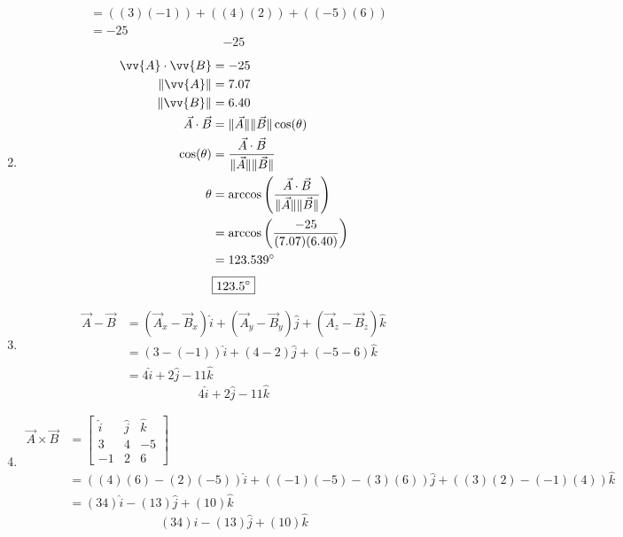 \documentclass{article}
\begin{document}
\begin{enumerate}[label=\alph*)]
\begin{align*}
                                & = ((3)(-1)) + ((4)(2)) + ((-5)(6)) \\
                                & = -25
        \end{align*}
        \begin{equation*}
            \boxed{-25}
        \end{equation*}
    \item
        \begin{align*}
            \vv{A} \cdot \vv{B} & = -25 \\
            \|\vv{A}\| & = 7.07 \\
            \|\vv{B}\| & = 6.40 \\
            \vec{A} \cdot \vec{B} & = \|\vec{A}\|\|\vec{B}\|\cos(\theta) \\
            \cos(\theta) & = \frac{\vec{A} \cdot \vec{B}}{\|\vec{A}\|\|\vec{B}\|} \\
            \theta & = \arccos\left(\frac{\vec{A} \cdot \vec{B}}{\|\vec{A}\|\|\vec{B}\|}\right) \\
                   & = \arccos\left(\frac{-25}{(7.07)(6.40)}\right) \\
                   & = 123.539\degree
        \end{align*}
        \begin{equation*}
            \boxed{123.5\degree}
        \end{equation*}
    \item
        \begin{align*}
            \vec{A} - \vec{B} & = (\vec{A}_x - \vec{B}_x)\hat{i} + (\vec{A}_y - \vec{B}_y)\hat{j} + (\vec{A}_z - \vec{B}_z)\hat{k} \\
                              & = (3 - (-1))\hat{i} + (4 - 2)\hat{j} + (-5 - 6)\hat{k} \\
                              & = 4\hat{i} + 2\hat{j} - 11\hat{k}
        \end{align*}
        \begin{equation*}
            \boxed{4\hat{i} + 2\hat{j} - 11\hat{k}}
        \end{equation*}
    \item
        \begin{align*}
            \vec{A} \times \vec{B} & =
                \begin{bmatrix}
                    \hat{i} & \hat{j} & \hat{k} \\
                    3 & 4 & -5 \\
                    -1 & 2 & 6
                \end{bmatrix} \\
            & = ((4)(6) - (2)(-5))\hat{i} + ((-1)(-5) - (3)(6))\hat{j} + ((3)(2) - (-1)(4))\hat{k} \\
            & = (34)\hat{i} - (13)\hat{j} + (10)\hat{k}
        \end{align*}
        \begin{equation*}
            \boxed{
                (34)\hat{i} - (13)\hat{j} + (10)\hat{k}
            }
        \end{equation*}
\end{enumerate}
\end{document}
